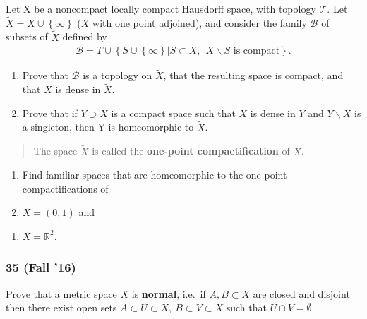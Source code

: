 \begin{problem}[?]

Let X be a noncompact locally compact Hausdorff space, with topology
\({\mathcal{T}}\). Let \(\tilde X = X \cup \left\{{\infty}\right\}\)
(\(X\) with one point adjoined), and consider the family
\({\mathcal{B}}\) of subsets of \(\tilde X\) defined by
\begin{align*}
{\mathcal{B}}= T \cup \left\{{S \cup \left\{{\infty}\right\}\mathrel{\Big|}S \subset X,~~ X \backslash S \text{ is compact}}\right\}
.\end{align*}

\begin{enumerate}
\def\labelenumi{\alph{enumi}.}
\item
  Prove that \({\mathcal{B}}\) is a topology on \(\tilde X\), that the
  resulting space is compact, and that \(X\) is dense in \(\tilde X\).
\item
  Prove that if \(Y \supset X\) is a compact space such that \(X\) is
  dense in \(Y\) and \(Y \backslash X\) is a singleton, then Y is
  homeomorphic to \(\tilde X\).
\end{enumerate}

\begin{quote}
The space \(\tilde X\) is called the \textbf{one-point compactification}
of \(X\).
\end{quote}

\begin{enumerate}
\def\labelenumi{\alph{enumi}.}
\setcounter{enumi}{2}
\item
  Find familiar spaces that are homeomorphic to the one point
  compactifications of
\item
  \(X = (0, 1)\) and
\end{enumerate}

\begin{enumerate}
\def\labelenumi{\roman{enumi}.}
\setcounter{enumi}{1}
\tightlist
\item
  \(X = {\mathbb{R}}^2\).
\end{enumerate}

\end{problem}

\hypertarget{fall-16-1}{%
\subsubsection{35 (Fall '16)}\label{fall-16-1}}

\begin{problem}[?]

Prove that a metric space \(X\) is \textbf{normal}, i.e.~if
\(A, B \subset X\) are closed and disjoint then there exist open sets
\(A \subset U \subset X, ~B \subset V \subset X\) such that
\(U \cap V = \emptyset\).

\end{problem}

